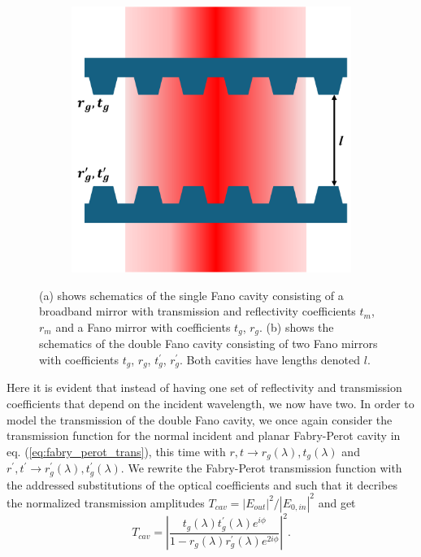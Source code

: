 \begin{figure}[h!]
\begin{subfigure}[b]{0.3\textwidth}
        \includegraphics[width=\textwidth]{figures/double_fano_sketch.pdf}
        \caption{}
        \label{fig:double_fano_sketch}
    \end{subfigure}
    \caption{(a) shows schematics of the single Fano cavity consisting of a broadband mirror with transmission and reflectivity coefficients $t_m$, $r_m$ and a Fano mirror with coefficients $t_g$, $r_g$. (b) shows the schematics of the double Fano cavity consisting of two Fano mirrors with coefficients $t_g$, $r_g$, $t_g^{\prime}$, $r_g^{\prime}$. Both cavities have lengths denoted $l$.}
    \label{fig:single_and_double_fano_sketch}
\end{figure}

Here it is evident that instead of having one set of reflectivity and transmission coefficients that depend on the incident wavelength, we now have two. In order to model the transmission of the double Fano cavity, we once again consider the transmission function for the normal incident and planar Fabry-Perot cavity in eq. (\ref{eq:fabry_perot_trans}), this time with $r,t \rightarrow r_g(\lambda),t_g(\lambda)$ and $r^{\prime},t^{\prime} \rightarrow r_g^{\prime}(\lambda),t_g^{\prime}(\lambda)$\cite{Naesby}. We rewrite the Fabry-Perot transmission function with the addressed substitutions of the optical coefficients and such that it decribes the normalized transmission amplitudes $T_{cav} = |E_{out}|^2/|E_{0,in}|^2$ and get
\begin{equation}
    T_{cav} = \left|\frac{t_g(\lambda) t_g^{\prime}(\lambda) e^{i\phi}}{1 - r_g(\lambda)r_g^{\prime}(\lambda) e^{2 i \phi}}\right|^2.
    \label{eq:double_fano_transmission}
\end{equation}

